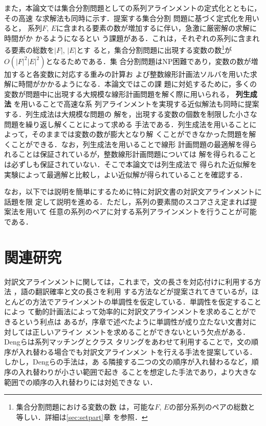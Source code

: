 \documentclass[japanese]{jnlp_1.4}
\begin{document}
また，本論文では集合分割問題としての系列アラインメントの定式化とともに，その高速
な求解法も同時に示す．提案する集合分割
問題に基づく定式化を用いると，
系列$F$, $E$に含まれる要素の数が増加するに伴い，急激に厳密解の求解に時間がか
かるようになるとい
う課題がある．これは，それぞれの系列に含まれる要素の総数を$|F|$, $|E|$とす
ると，集合分割問題に出現する変数の数\footnote{集合分割問題における変数の数
は，可能な$F$, $E$の部分系列のペアの総数と等しい．詳細は\ref{sec:setpart}章
を参照．}が$O(|F|^{2}|E|^{2})$となるためである．集
合分割問題はNP困難であり，変数の数が増加すると各変数に対応する重みの計算お
よび整数線形計画法ソルバを用いた求解に時間がかかるようになる．本論文ではこの課
題に対処するために，多くの変数が問題中に出現する大規模な線形計画問題を解く際に用いられる，
\textbf{列生成法} \cite{lubbecke05:_selec_topic_colum_gener} を用いることで高速な系
列アラインメントを実現する近似解法も同時に提案する．列生成法は大規模な問題の
解を，出現する変数の個数を制限した小さな問題を繰り返し解くことによって求める
手法である．列生成法を用いることによって，そのままでは変数の数が膨大となり解
くことができなかった問題を解くことができる．なお，列生成法を用いることで線形
計画問題の最適解を得られることは保証されているが，整数線形計画問題については
解を得られることは必ずしも保証されていない．そこで本論文では列生成法で
得られた近似解を実験によって最適解と比較し，よい近似解が得られていることを確認する．

なお，以下では説明を簡単にするために特に対訳文書の対訳文アラインメントに話題を限
定して説明を進める．ただし，系列の要素間のスコアさえ定まれば提案法を用いて
任意の系列のペアに対する系列アラインメントを行うことが可能である．


\section{関連研究}

対訳文アラインメントに関しては，これまで，文の長さを対応付けに利用する方法
\cite{gale93:_progr_align_senten_bilin_corpor}，語の翻訳確率と文の長さを利用
する方法\cite{moore02:_fast,braune10:_improv}などが提案されてきているが，ほ
とんどの方法でアラインメントの単調性を仮定している．単調性を仮定することによっ
て動的計画法によって効率的に対訳文アラインメントを求めることができるという利点は
あるが，序章で述べたように単調性が成り立たない文書対に対しては正しいアライン
メントを求めることができないという欠点がある．Dengらは系列マッチングとクラス
タリングをあわせて利用することで，文の順序が入れ替わる場合でも対訳文アラインメン
トを行える手法を提案している\cite{deng07:_segmen}．しかし，Dengらの手法は，あ
る隣接する二つの文の順序が入れ替わるなど，順序の入れ替わりが小さい範囲で起き
ることを想定した手法であり，より大きな範囲での順序の入れ替わりには対処できな
い．
\end{document}
